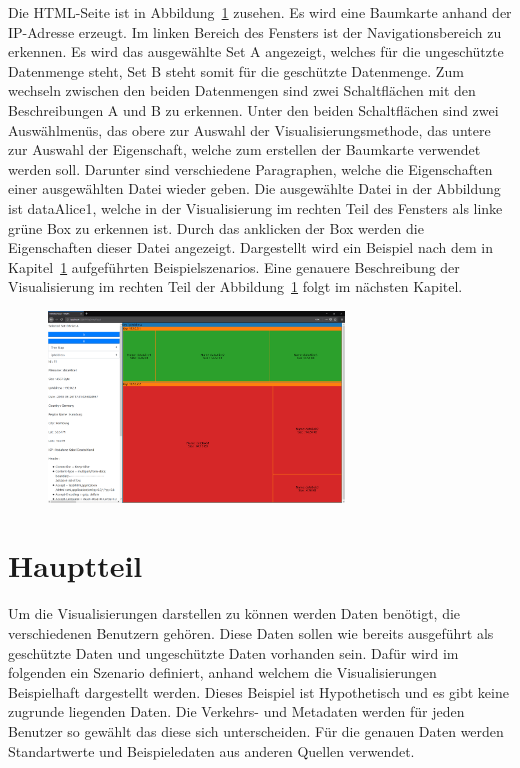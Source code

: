 \documentclass[
    fontsize=12pt,
    headings=small,
    parskip=half,           %
    bibliography=totoc,
    numbers=noenddot,       %
    open=any,               %
    ]{scrreprt}
\begin{document}
Die HTML-Seite ist in Abbildung~\ref{fig:VisualPageAll} zusehen. 
Es wird eine Baumkarte anhand der IP-Adresse erzeugt. 
Im linken Bereich des Fensters ist der Navigationsbereich zu erkennen. 
Es wird das ausgewählte Set A angezeigt, welches für die ungeschützte Datenmenge steht, Set B steht somit für die geschützte Datenmenge.
Zum wechseln zwischen den beiden Datenmengen sind zwei Schaltflächen mit den Beschreibungen A und B zu erkennen.
Unter den beiden Schaltflächen sind zwei Auswählmenüs, das obere zur Auswahl der Visualisierungsmethode, das untere zur Auswahl der Eigenschaft, welche zum erstellen der Baumkarte verwendet werden soll.
Darunter sind verschiedene Paragraphen, welche die Eigenschaften einer ausgewählten Datei wieder geben.
Die ausgewählte Datei in der Abbildung ist dataAlice1, welche in der Visualisierung im rechten Teil des Fensters als linke grüne Box zu erkennen ist.
Durch das anklicken der Box werden die Eigenschaften dieser Datei angezeigt. 
Dargestellt wird ein Beispiel nach dem in Kapitel~\ref{Kap:Szenarios} aufgeführten Beispielszenarios.
Eine genauere Beschreibung der Visualisierung im rechten Teil der Abbildung~\ref{fig:VisualPageAll} folgt im nächsten Kapitel. 

\begin{figure}[H]
\includegraphics[width=0.7\textwidth]{../pic/VisualPageAll.png}
\label{fig:VisualPageAll}
\end{figure}


\chapter{Hauptteil} \label{Kap:Szenarios}

Um die Visualisierungen darstellen zu können werden Daten benötigt, die verschiedenen Benutzern gehören.
Diese Daten sollen wie bereits ausgeführt als geschützte Daten und ungeschützte Daten vorhanden sein. 
Dafür wird im folgenden ein Szenario definiert, anhand welchem die Visualisierungen Beispielhaft dargestellt werden. 
Dieses Beispiel ist Hypothetisch und es gibt keine zugrunde liegenden Daten. 
Die Verkehrs- und Metadaten werden für jeden Benutzer so gewählt das diese sich unterscheiden. 
Für die genauen Daten werden Standartwerte und Beispieledaten aus anderen Quellen verwendet. 
\end{document}
